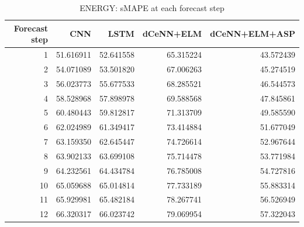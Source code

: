 \begin{table}
\caption{ENERGY: sMAPE at each forecast step}
\begin{tabular}{rrrrr}
\toprule
Forecast step & CNN & LSTM & dCeNN+ELM & dCeNN+ELM+ASP \\
\midrule
1 & 51.616911 & 52.641558 & 65.315224 & 43.572439 \\
2 & 54.071089 & 53.501820 & 67.006263 & 45.274519 \\
3 & 56.023773 & 55.677533 & 68.285521 & 46.544573 \\
4 & 58.528968 & 57.898978 & 69.588568 & 47.845861 \\
5 & 60.480443 & 59.812817 & 71.313709 & 49.585590 \\
6 & 62.024989 & 61.349417 & 73.414884 & 51.677049 \\
7 & 63.159350 & 62.645447 & 74.726614 & 52.967644 \\
8 & 63.902133 & 63.699108 & 75.714478 & 53.771984 \\
9 & 64.232561 & 64.434784 & 76.785008 & 54.727816 \\
10 & 65.059688 & 65.014814 & 77.733189 & 55.883314 \\
11 & 65.929981 & 65.482184 & 78.267741 & 56.526949 \\
12 & 66.320317 & 66.023742 & 79.069954 & 57.322043 \\
\bottomrule
\end{tabular}
\end{table}
